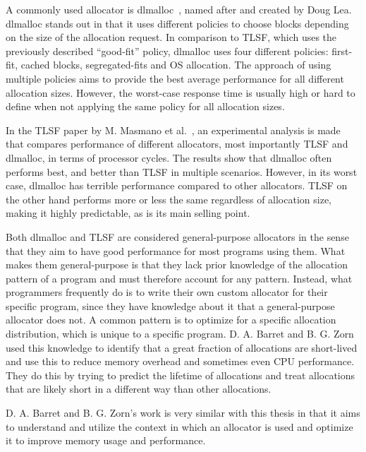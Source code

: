 

A commonly used allocator is dlmalloc~\cite{dlmalloc}, named after and created by Doug Lea. dlmalloc stands out in that it uses different policies to choose blocks depending on the size of the allocation request. In comparison to TLSF, which uses the previously described ``good-fit'' policy, dlmalloc uses four different policies: first-fit, cached blocks, segregated-fits and OS allocation. The approach of using multiple policies aims to provide the best average performance for all different allocation sizes. However, the worst-case response time is usually high or hard to define when not applying the same policy for all allocation sizes.

In the TLSF paper by M. Masmano et al.~\cite{TLSF}, an experimental analysis is made that compares performance of different allocators, most importantly TLSF and dlmalloc, in terms of processor cycles. The results show that dlmalloc often performs best, and better than TLSF in multiple scenarios. However, in its worst case, dlmalloc has terrible performance compared to other allocators. TLSF on the other hand performs more or less the same regardless of allocation size, making it highly predictable, as is its main selling point.


Both dlmalloc and TLSF are considered general-purpose allocators in the sense that they aim to have good performance for most programs using them. What makes them general-purpose is that they lack prior knowledge of the allocation pattern of a program and must therefore account for any pattern. Instead, what programmers frequently do is to write their own custom allocator for their specific program, since they have knowledge about it that a general-purpose allocator does not. A common pattern is to optimize for a specific allocation distribution, which is unique to a specific program. D. A. Barret and B. G. Zorn~\cite{lifetime_predictors_memalloc} used this knowledge to identify that a great fraction of allocations are short-lived and use this to reduce memory overhead and sometimes even CPU performance. They do this by trying to predict the lifetime of allocations and treat allocations that are likely short in a different way than other allocations.

D. A. Barret and B. G. Zorn's work is very similar with this thesis in that it aims to understand and utilize the context in which an allocator is used and optimize it to improve memory usage and performance.



